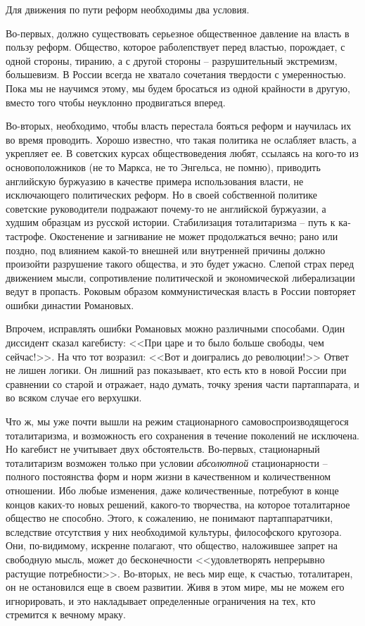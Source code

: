 \documentclass{book}
\begin{document}
Для движения по пути реформ необходимы два условия.

Во-первых, должно существовать серьезное общественное давление на власть в пользу реформ. Общество, которое раболепствует перед властью, порождает, с одной стороны, тиранию, а с другой стороны -- разрушительный экстремизм, большевизм. В России всегда не хватало сочетания твердости с уме­ренностью. Пока мы не научимся этому, мы будем бросаться из одной крайности в другую, вместо того чтобы неуклонно продвигаться вперед.

Во-вторых, необходимо, чтобы власть перестала бояться реформ и научилась их во время проводить. Хорошо известно, что такая политика не ослабляет власть, а укрепляет ее. В советских курсах обществоведения любят, ссылаясь на кого-то из основоположников (не то Маркса, не то Энгельса, не помню), приводить английскую буржуазию в качестве примера использования власти, не исключающего политических реформ. Но в своей собственной политике советские руководители подра­жают почему-то не английской буржуазии, а худшим образцам из русской истории. Стабилизация тоталитаризма -- путь к ка­тастрофе. Окостенение и загнивание не может продолжаться вечно; рано или поздно, под влиянием какой-то внешней или внутренней причины должно произойти разрушение такого об­щества, и это будет ужасно. Слепой страх перед движением мысли, сопротивление политической и экономической либера­лизации ведут в пропасть. Роковым образом коммунистиче­ская власть в России повторяет ошибки династии Романовых.

Впрочем, исправлять ошибки Романовых можно различны­ми способами. Один диссидент сказал кагебисту: <<При царе и то было больше свободы, чем сейчас!>>. На что тот возразил: <<Вот и доигрались до революции!>> Ответ не лишен логики. Он лишний раз показывает, кто есть кто в новой России при сравнении со старой и отражает, надо думать, точку зрения части партаппарата, и во всяком случае его верхушки.

Что ж, мы уже почти вышли на режим стационарного самовоспроизводящегося тоталитаризма, и возможность его сохранения в течение поколений не исключена. Но кагебист не учитывает двух обстоятельств. Во-первых, стационарный тоталитаризм возможен только при условии \textit{абсолютной}  стационарности -- полного постоянства форм и норм жизни в качественном и количественном отношении. Ибо любые изменения, даже количественные, потребуют в конце концов каких-то новых решений, какого-то творчества, на которое тоталитарное общество не способно. Этого, к сожалению, не понимают партаппаратчики, вследствие отсутствия у них необходимой куль­туры, философского кругозора. Они, по-видимому, искренне полагают, что общество, наложившее запрет на свободную мысль, может до бесконечности <<удовлетворять непрерывно растущие потребности>>. Во-вторых, не весь мир еще, к счастью, тоталитарен, он не остановился еще в своем развитии. Живя в этом мире, мы не можем его игнорировать, и это накладывает определенные ограничения на тех, кто 
стремится к 
вечному мраку.
\end{document}
